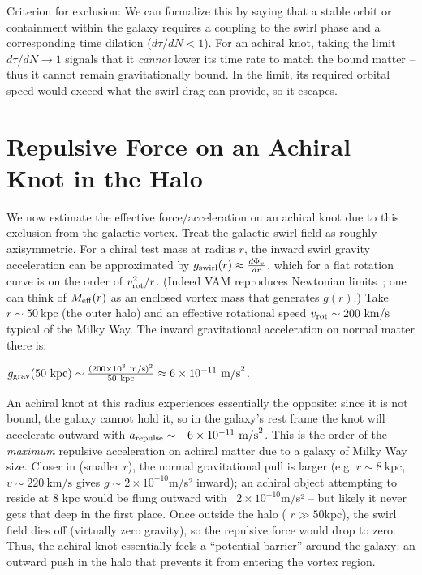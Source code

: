 Criterion for exclusion: We can formalize this by saying that a stable orbit or containment within the galaxy requires a coupling to the swirl phase and a corresponding time dilation ($d\tau/dN < 1$). For an achiral knot, taking the limit $d\tau/dN \to 1$ signals that it \textit{cannot} lower its time rate to match the bound matter – thus it cannot remain gravitationally bound. In the limit, its required orbital speed would exceed what the swirl drag can provide, so it escapes.


\section*{Repulsive Force on an Achiral Knot in the Halo}

We now estimate the effective force/acceleration on an achiral knot due to this exclusion from the galactic vortex. Treat the galactic swirl field as roughly axisymmetric. For a chiral test mass at radius $r$, the inward swirl gravity acceleration can be approximated by $g_{\rm swirl}(r) \approx \frac{d\Phi_v}{dr}$, which for a flat rotation curve is on the order of $v_{\rm rot}^2/r$. (Indeed VAM reproduces Newtonian limits~\cite{iskandarani2025vam2}; one can think of $M_{\rm eff}(r)$ as an enclosed vortex mass that generates $g(r)$.) Take $r \sim 50~\text{kpc}$ (the outer halo) and an effective rotational speed $v_{\rm rot}\sim 200~\text{km/s}$ typical of the Milky Way. The inward gravitational acceleration on normal matter there is:


$g_{\rm grav}(50~\text{kpc}) \sim \frac{(200\times10^3~\text{m/s})^2}{50~\text{kpc}} \approx 6\times10^{-11}~\text{m/s}^2$.


An achiral knot at this radius experiences essentially the opposite: since it is not bound, the galaxy cannot hold it, so in the galaxy’s rest frame the knot will accelerate outward with $a_{\rm repulse} \sim +6\times10^{-11}~\text{m/s}^2$. This is the order of the \textit{maximum} repulsive acceleration on achiral matter due to a galaxy of Milky Way size. Closer in (smaller $r$), the normal gravitational pull is larger (e.g. $r\sim 8~\text{kpc}$, $v\sim220~\text{km/s}$ gives $g\sim2\times10^{-10}$m/s² inward); an achiral object attempting to reside at 8 kpc would be flung outward with ~$2\times10^{-10}$m/s² – but likely it never gets that deep in the first place. Once outside the halo ( $r \gg 50$kpc), the swirl field dies off (virtually zero gravity), so the repulsive force would drop to zero. Thus, the achiral knot essentially feels a “potential barrier” around the galaxy: an outward push in the halo that prevents it from entering the vortex region.


